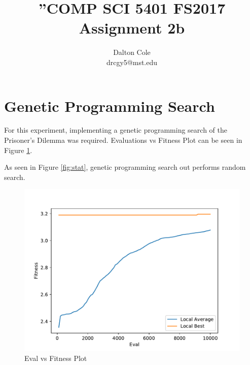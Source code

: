 \documentclass[times]{article}
\begin{document}
	\title{”COMP SCI 5401 FS2017 Assignment 2b}
	\author{Dalton Cole \\ drcgy5@mst.edu}
	\date{}
	\maketitle

	\section{Genetic Programming Search}
	For this experiment, implementing a genetic programming search of the Prisoner's Dilemma was required. Evaluations vs Fitness Plot can be seen in Figure \ref{fig:plot}.

	As seen in Figure \ref{fig:stat}, genetic programming search out performs random search.

	\begin{figure}
		\caption{Eval vs Fitness Plot}
		\label{fig:plot}
		\includegraphics[width=\textwidth]{../graph/graphs/0.pdf}
	\end{figure}
\end{document}
